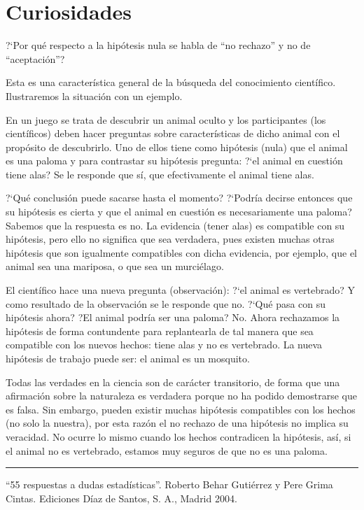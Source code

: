 \section{Curiosidades}
\begin{myexampleblock}{?`Por qué respecto a la hipótesis nula se habla de ``no rechazo'' y no de ``aceptación''?}
 
\vspace{2mm} Esta es una característica general de la búsqueda del conocimiento científico. Ilustraremos la situación con un ejemplo.

\vspace{2mm} En un juego se trata de descubrir un animal oculto y los participantes (los científicos) deben hacer preguntas sobre características de dicho animal con el propósito de descubrirlo. Uno de ellos tiene como hipótesis (nula) que el animal es una paloma y para contrastar su hipótesis pregunta: ?`el animal en cuestión tiene alas? Se le responde que sí, que efectivamente el animal tiene alas.

\vspace{2mm} ?`Qué conclusión puede sacarse hasta el momento? ?`Podría decirse entonces que su hipótesis es cierta y que el animal en cuestión es necesariamente una paloma? Sabemos que la respuesta es no. La evidencia (tener alas) es compatible con su hipótesis, pero ello no significa que sea verdadera, pues existen muchas otras hipótesis que son igualmente compatibles con dicha evidencia, por ejemplo, que el animal sea una mariposa, o que sea un murciélago.

\vspace{2mm} El científico hace una nueva pregunta (observación): ?`el animal es vertebrado? Y como resultado de la observación se le responde que no. ?`Qué pasa con su hipótesis ahora? ?El animal podría ser una paloma? No. Ahora rechazamos la hipótesis de forma contundente para replantearla de tal manera que sea compatible con los nuevos hechos: tiene alas y no es vertebrado. La nueva hipótesis de trabajo puede ser: el animal es un mosquito.

\vspace{2mm} Todas las verdades en la ciencia son de carácter transitorio, de forma que una afirmación sobre la naturaleza es verdadera porque no ha podido demostrarse que es falsa. Sin embargo, pueden existir muchas hipótesis compatibles con los hechos (no solo la nuestra), por esta razón el no rechazo de una hipótesis no implica su veracidad. No ocurre lo mismo cuando los hechos contradicen la hipótesis, así, si el animal no es vertebrado, estamos muy seguros de que no es una paloma.	

\rule{200pt}{0.1pt}

\footnotesize{``55 respuestas a dudas estadísticas''. Roberto Behar Gutiérrez y Pere Grima Cintas. Ediciones Díaz de Santos, S. A., Madrid 2004}\normalsize{.}
\end{myexampleblock}

